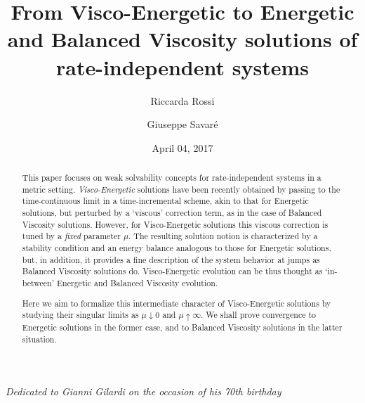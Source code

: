 \documentclass[a4paper,10pt,reqno]{amsart} %
\title[From Visco-Energetic to Energetic and $\BV$ solutions]{From Visco-Energetic to Energetic and Balanced Viscosity solutions of rate-independent systems}
\author{Riccarda Rossi}
\author{Giuseppe Savar\'e}
\date{April 04, 2017}
\numberwithin{equation}{section}
\newcommand{\down}{\downarrow}
\begin{document}
\begin{abstract} This  paper focuses on  weak solvability concepts for rate-independent systems in  a metric setting.
\emph{Visco-Energetic} solutions have been recently obtained by passing to the time-continuous limit in  a time-incremental scheme, akin to that for Energetic solutions, but perturbed by a `viscous' correction term, as in the case of Balanced Viscosity solutions. However, for Visco-Energetic solutions this viscous correction  is tuned by a \emph{fixed} parameter $\mu$. The resulting solution notion 
is characterized by a stability condition and an energy balance analogous to those for Energetic solutions, but, in addition, it provides a fine description of the system behavior at jumps as Balanced Viscosity solutions do. Visco-Energetic evolution can be thus thought as `in-between' Energetic and Balanced Viscosity evolution.
\par
Here
we aim to formalize this intermediate character of Visco-Energetic solutions by studying their singular limits as $\mu\down 0$ and $\mu\uparrow \infty$. We shall prove convergence to Energetic solutions in the former case, and to Balanced Viscosity solutions in the latter situation. 
\end{abstract}

\maketitle


\centerline{\emph{Dedicated to Gianni Gilardi on the occasion of his 70th birthday}}

\end{document}
